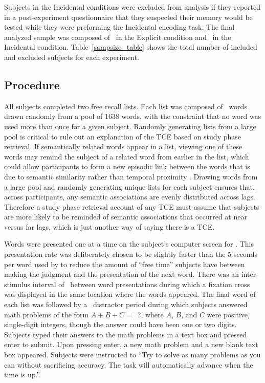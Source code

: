 \documentclass[man,natbib,floatsintext]{apa6} %
\begin{document}
Subjects in the Incidental conditions were excluded from analysis if they reported in a post-experiment questionnaire that they suspected their memory would be tested while they were preforming the Incidental encoding task. The final analyzed sample was composed of \shoeExplicitIncluded~in the Explicit condition and \shoeIncidentalIncluded~in the Incidental condition. Table~\ref{sampsize_table} shows the total number of included and excluded subjects for each experiment.

\subsection{Procedure}
All subjects completed two free recall lists. Each list was composed of \listlength~words drawn randomly from a pool of 1638 words, with the constraint that no word was used more than once for a given subject.  Randomly generating lists from a large pool is critical to rule out an explanation of the TCE based on study phase retrieval. If semantically related words appear in a list, viewing one of these words may remind the subject of a related word from earlier in the list, which could allow participants to form a new episodic link between the words that is due to semantic similarity rather than temporal proximity \citep{HintEtal75,HintBloc73,Hint16}. Drawing words from a large pool and randomly generating unique lists for each subject ensures that, across participants, any semantic associations are evenly distributed across lags. Therefore a study phase retrieval account of any TCE must assume that subjects are more likely to be reminded of semantic associations that occurred at near versus far lags, which is just another way of saying there is a TCE. 

Words were presented one at a time on the subject's computer screen for \presrate. This presentation rate was deliberately chosen to be slightly faster than the 5 seconds per word used by \citet{NairEtal17} to reduce the amount of ``free time'' subjects have between making the judgment and the presentation of the next word.
There was an inter-stimulus interval of \isi~between word presentations during which a fixation cross was displayed in the same location where the words appeared. The final word of each list was followed by a \DFRDelay~distractor period during which subjects answered math problems of the form $A+B+C=$~?, where $A$, $B$, and $C$ were positive, single-digit integers, though the answer could have been one or two digits. Subjects typed their answers to the math problems in a text box and pressed enter to submit. Upon pressing enter, a new math problem and a new blank text box appeared. Subjects were instructed to ``Try to solve as many problems as you can without sacrificing accuracy. The task will automatically advance when the time is up.''.
\end{document}
